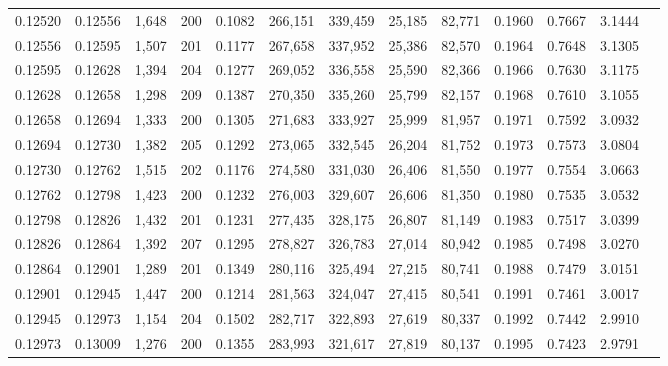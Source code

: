 \begin{tabular}{rrrrrrrrrrrrr}
0.12520 & 0.12556 & 1,648 & 200 &                                     0.1082 & 266,151 & 339,459 &  25,185 &  82,771 & 0.1960 & 0.7667 & 3.1444 \\
0.12556 & 0.12595 & 1,507 & 201 &                                     0.1177 & 267,658 & 337,952 &  25,386 &  82,570 & 0.1964 & 0.7648 & 3.1305 \\
0.12595 & 0.12628 & 1,394 & 204 &                                     0.1277 & 269,052 & 336,558 &  25,590 &  82,366 & 0.1966 & 0.7630 & 3.1175 \\
0.12628 & 0.12658 & 1,298 & 209 &                                     0.1387 & 270,350 & 335,260 &  25,799 &  82,157 & 0.1968 & 0.7610 & 3.1055 \\
0.12658 & 0.12694 & 1,333 & 200 &                                     0.1305 & 271,683 & 333,927 &  25,999 &  81,957 & 0.1971 & 0.7592 & 3.0932 \\
0.12694 & 0.12730 & 1,382 & 205 &                                     0.1292 & 273,065 & 332,545 &  26,204 &  81,752 & 0.1973 & 0.7573 & 3.0804 \\
0.12730 & 0.12762 & 1,515 & 202 &                                     0.1176 & 274,580 & 331,030 &  26,406 &  81,550 & 0.1977 & 0.7554 & 3.0663 \\
0.12762 & 0.12798 & 1,423 & 200 &                                     0.1232 & 276,003 & 329,607 &  26,606 &  81,350 & 0.1980 & 0.7535 & 3.0532 \\
0.12798 & 0.12826 & 1,432 & 201 &                                     0.1231 & 277,435 & 328,175 &  26,807 &  81,149 & 0.1983 & 0.7517 & 3.0399 \\
0.12826 & 0.12864 & 1,392 & 207 &                                     0.1295 & 278,827 & 326,783 &  27,014 &  80,942 & 0.1985 & 0.7498 & 3.0270 \\
0.12864 & 0.12901 & 1,289 & 201 &                                     0.1349 & 280,116 & 325,494 &  27,215 &  80,741 & 0.1988 & 0.7479 & 3.0151 \\
0.12901 & 0.12945 & 1,447 & 200 &                                     0.1214 & 281,563 & 324,047 &  27,415 &  80,541 & 0.1991 & 0.7461 & 3.0017 \\
0.12945 & 0.12973 & 1,154 & 204 &                                     0.1502 & 282,717 & 322,893 &  27,619 &  80,337 & 0.1992 & 0.7442 & 2.9910 \\
0.12973 & 0.13009 & 1,276 & 200 &                                     0.1355 & 283,993 & 321,617 &  27,819 &  80,137 & 0.1995 & 0.7423 & 2.9791 \\

\end{tabular}

